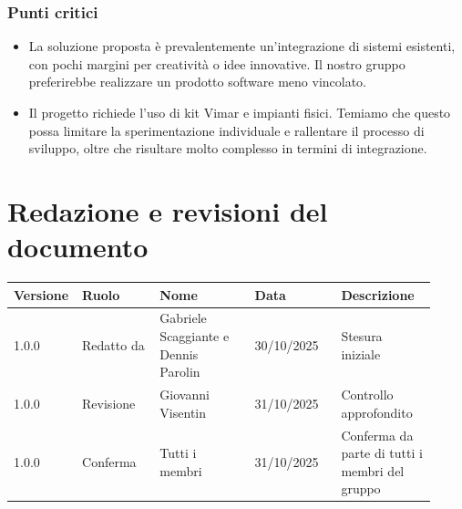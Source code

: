 \documentclass[a4paper,12pt]{article}
\begin{document}
\subsubsection{Punti critici}
\begin{itemize}
    \item La soluzione proposta è prevalentemente un’integrazione di sistemi esistenti, con pochi margini per creatività o idee innovative. Il nostro gruppo preferirebbe realizzare un prodotto software meno vincolato.
    \item Il progetto richiede l’uso di kit Vimar e impianti fisici. Temiamo che questo possa limitare la sperimentazione individuale e rallentare il processo di sviluppo, oltre che risultare molto complesso in termini di integrazione.
\end{itemize}



\clearpage
\section{Redazione e revisioni del documento}

\begin{center}
\small
\renewcommand{\arraystretch}{1.2} 
\begin{tabular}{|p{0.1\linewidth}|p{0.18\linewidth}|p{0.22\linewidth}|p{0.20\linewidth}|p{0.22\linewidth}|}
\hline
\rowcolor{gray!60} 
\textbf{Versione} & \textbf{Ruolo} & \textbf{Nome} & \textbf{Data} & \textbf{Descrizione} \\
\hline
\rowcolor{white}
1.0.0 & Redatto da & Gabriele Scaggiante e Dennis Parolin & 30/10/2025 & Stesura iniziale \\
\hline
\rowcolor{gray!20}
1.0.0 & Revisione & Giovanni Visentin & 31/10/2025 & Controllo approfondito  \\
\hline
\rowcolor{white}
1.0.0 & Conferma & Tutti i membri & 31/10/2025 & Conferma da parte di tutti i membri del gruppo \\
\hline

\end{tabular}
\end{center}
\end{document}
